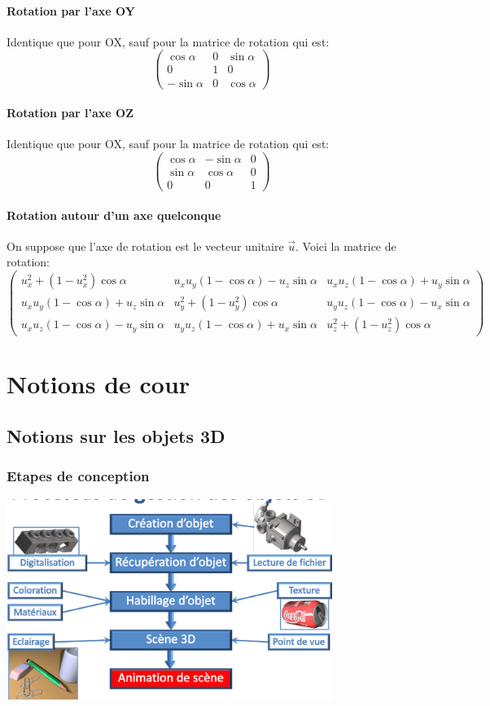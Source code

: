 \documentclass{report}
\begin{document}
\subsection{Rotation par l'axe OY}
Identique que pour OX, sauf pour la matrice de rotation qui est:
\[
 \begin{pmatrix}
  \cos \alpha & 0 & \sin \alpha\\
  0 & 1 & 0\\
  -\sin \alpha & 0 & \cos \alpha
 \end{pmatrix}
\]
\subsection{Rotation par l'axe OZ}
Identique que pour OX, sauf pour la matrice de rotation qui est:
\[
 \begin{pmatrix}
  \cos \alpha & -\sin \alpha & 0\\
  \sin \alpha & \cos \alpha & 0\\
  0 & 0 & 1
 \end{pmatrix}
\]
\subsection{Rotation autour d'un axe quelconque}
On suppose que l'axe de rotation est le vecteur unitaire $\vec{u}$.
Voici la matrice de rotation:
\[
 \begin{pmatrix}
  u_x^2 + (1 - u_x^2) \cos \alpha & u_x u_y (1 - \cos \alpha) - u_z \sin \alpha & u_x u_z (1 - \cos \alpha) + u_y \sin \alpha\\
  u_x u_y (1 - \cos \alpha) + u_z \sin \alpha & u_y^2 + (1 - u_y^2) \cos \alpha & u_y u_z (1 - \cos \alpha) - u_x \sin \alpha\\
  u_x u_z (1 - \cos \alpha) - u_y \sin \alpha & u_y u_z (1 - \cos \alpha) + u_x \sin \alpha &  u_z^2 + (1 - u_z^2) \cos \alpha
 \end{pmatrix}
\]

\part{Notions de cour}
\chapter{Notions sur les objets 3D}
\section{Etapes de conception}
\includegraphics[width=400px]{./schema_conception.png}
\end{document}
